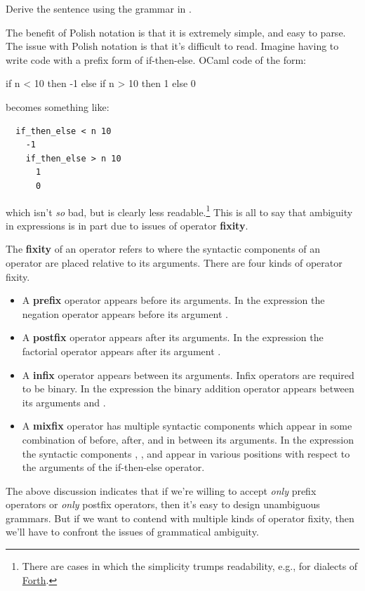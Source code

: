 \begin{exercise}
  Derive the sentence  using the grammar in .
\end{exercise}
%
The benefit of Polish notation is that it is extremely simple, and easy to parse.
The issue with Polish notation is that it's difficult to read.
Imagine having to write code with a prefix form of if-then-else.
OCaml code of the form:
%
\begin{ocaml}
  if n < 10
  then -1
  else if n > 10
  then 1
  else 0
\end{ocaml}
becomes something like:
\begin{lstlisting}
  if_then_else < n 10
    -1
    if_then_else > n 10
      1
      0
\end{lstlisting}
which isn't \textit{so} bad, but is clearly less readable.\footnote{
  There are cases in which the simplicity trumps readability, e.g., for dialects of \href{https://www.forth.com/forth/}{Forth}.
}
This is all to say that ambiguity in expressions is in part due to issues of operator \textbf{fixity}.
%
\begin{definition}
The \textbf{fixity} of an operator refers to where the syntactic components of an operator are placed relative to its arguments.
There are four kinds of operator fixity.
\begin{itemize}
\item
A \textbf{prefix} operator appears before its arguments.
In the expression  the negation operator \codel{-} appears before its argument .
\item
A \textbf{postfix} operator appears after its arguments.
In the expression  the factorial operator \codel{!} appears after its argument .
\item
A \textbf{infix} operator appears between its arguments.
Infix operators are required to be binary.
In the expression  the binary addition operator \codel{+} appears between its arguments  and .
\item
A \textbf{mixfix} operator has multiple syntactic components which appear in some combination of before, after, and in between its arguments.
In the expression  the syntactic components , , and  appear in various positions with respect to the arguments of the if-then-else operator.
\end{itemize}
\end{definition}
%
The above discussion indicates that if we're willing to accept \textit{only} prefix operators or \textit{only} postfix operators, then it's easy to design unambiguous grammars.
But if we want to contend with multiple kinds of operator fixity, then we'll have to confront the issues of grammatical ambiguity.

